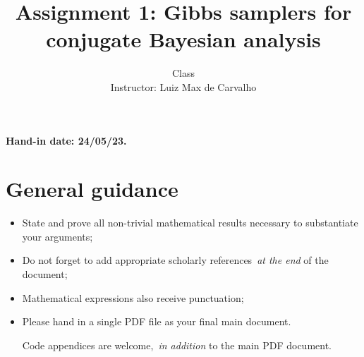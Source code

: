 \documentclass[a4paper,10pt, notitlepage]{report}
\title{Assignment 1: Gibbs samplers for conjugate Bayesian analysis}
\author{Class \\ Instructor: Luiz Max de Carvalho}
\begin{document}
\maketitle

\textbf{Hand-in date: 24/05/23.}

\section*{General guidance}
\begin{itemize}
 \item State and prove all non-trivial mathematical results necessary to substantiate your arguments;
 \item Do not forget to add appropriate scholarly references~\textit{at the end} of the document;
 \item Mathematical expressions also receive punctuation;
 \item Please hand in a single PDF file as your final main document.
 
 Code appendices are welcome,~\textit{in addition} to the main PDF document.
 \end{itemize}

\newpage
\end{document}

